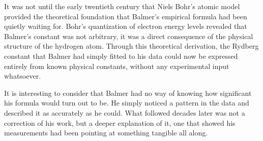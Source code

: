 \documentclass[12pt]{article}
\begin{document}
It was not until the early twentieth century that Niels Bohr's atomic model
provided the theoretical foundation that Balmer's empirical formula had been
quietly waiting for. Bohr's quantization of electron energy levels revealed
that Balmer's constant was not arbitrary, it was a direct consequence of
the physical structure of the hydrogen atom. Through this theoretical
derivation, the Rydberg constant that Balmer had simply fitted to his data
could now be expressed entirely from known physical constants, without any
experimental input whatsoever.

It is interesting to consider that Balmer had no way of knowing how significant
his formula would turn out to be. He simply noticed a pattern in the data and
described it as accurately as he could. What followed decades later was not a
correction of his work, but a deeper explanation of it, one that showed his
measurements had been pointing at something tangible all along.
\end{document}
